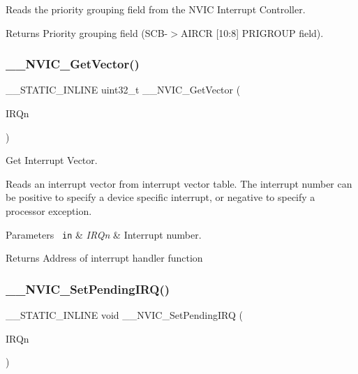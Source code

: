 Reads the priority grouping field from the N\+V\+IC Interrupt Controller. \begin{DoxyReturn}{Returns}
Priority grouping field (S\+C\+B-\/$>$A\+I\+R\+CR \mbox{[}10\+:8\mbox{]} P\+R\+I\+G\+R\+O\+UP field). 
\end{DoxyReturn}
\mbox{\label{group___c_m_s_i_s___core___n_v_i_c_functions_ga44b665d2afb708121d9b10c76ff00ee5}} 
\subsubsection{\texorpdfstring{\_\_NVIC\_GetVector()}{\_\_NVIC\_GetVector()}}
{\footnotesize\ttfamily \+\_\+\+\_\+\+S\+T\+A\+T\+I\+C\+\_\+\+I\+N\+L\+I\+NE uint32\+\_\+t \+\_\+\+\_\+\+N\+V\+I\+C\+\_\+\+Get\+Vector (\begin{DoxyParamCaption}\item[{\mbox{\hyperlink{group___configuration__section__for___c_m_s_i_s_ga7e1129cd8a196f4284d41db3e82ad5c8}{I\+R\+Qn\+\_\+\+Type}}}]{I\+R\+Qn }\end{DoxyParamCaption})}



Get Interrupt Vector. 

Reads an interrupt vector from interrupt vector table. The interrupt number can be positive to specify a device specific interrupt, or negative to specify a processor exception. 
\begin{DoxyParams}[1]{Parameters}
\mbox{\texttt{ in}}  & {\em I\+R\+Qn} & Interrupt number. \\
\hline
\end{DoxyParams}
\begin{DoxyReturn}{Returns}
Address of interrupt handler function 
\end{DoxyReturn}
\mbox{\label{group___c_m_s_i_s___core___n_v_i_c_functions_gaabefdd4b790b9a7308929938c0c1e1ad}} 
\subsubsection{\texorpdfstring{\_\_NVIC\_SetPendingIRQ()}{\_\_NVIC\_SetPendingIRQ()}}
{\footnotesize\ttfamily \+\_\+\+\_\+\+S\+T\+A\+T\+I\+C\+\_\+\+I\+N\+L\+I\+NE void \+\_\+\+\_\+\+N\+V\+I\+C\+\_\+\+Set\+Pending\+I\+RQ (\begin{DoxyParamCaption}\item[{\mbox{\hyperlink{group___configuration__section__for___c_m_s_i_s_ga7e1129cd8a196f4284d41db3e82ad5c8}{I\+R\+Qn\+\_\+\+Type}}}]{I\+R\+Qn }\end{DoxyParamCaption})}



